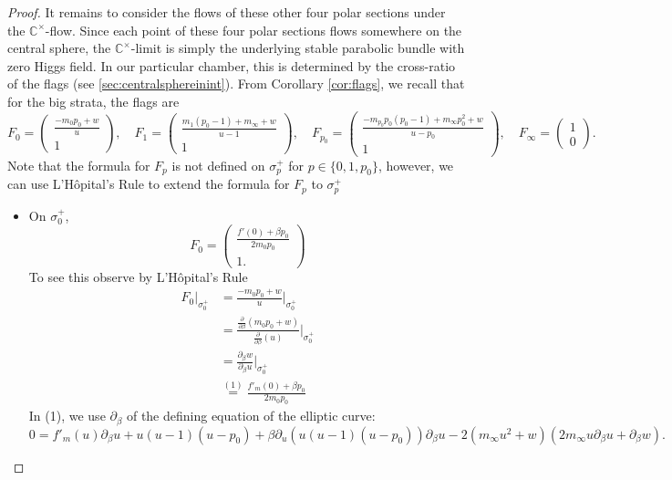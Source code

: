 \documentclass[10pt,a4paper]{amsart}
\newcommand{\C}{\ensuremath{\mathbb C}}
\def\mathbf#1{#1}%
\begin{document}
\begin{proof}
It remains to consider the flows of these other four polar sections under the $\C^\times$-flow.  Since each point of these four polar sections flows somewhere on the central sphere, the $\C^\times$-limit is simply the underlying stable parabolic bundle with zero Higgs field. In our particular chamber, this is determined by the cross-ratio of the flags (see \ref{sec:centralsphereinint}).
From Corollary \ref{cor:flags}, we recall that for the big strata, the flags are    \begin{equation*}
    F_0 = \begin{pmatrix} \frac{-m_0 p_0 +w}{u} \\ 1 \end{pmatrix}, \quad 
      F_1 = 
  \begin{pmatrix} \frac{m_1(p_0-1) + m_\infty +w}{u-1} \\ 1 \end{pmatrix}, \quad 
        F_{p_0} = \begin{pmatrix} \frac{-m_{p_0} p_0(p_0-1) + m_\infty p_0^2 +w}{u-p_0}\\ 1 \end{pmatrix}, \quad 
          F_\infty = \begin{pmatrix} 1\\ 0 \end{pmatrix}.
   \end{equation*}
   Note that the formula for $F_p$ is not defined on $\sigma^+_p$ for $p \in \{0, 1, p_0\}$, however, we can use L'H\^{o}pital's Rule to extend the formula for $F_p$ to $\sigma^+_p$
\begin{itemize}
\item On $\sigma^+_0$, \[
F_0 = \begin{pmatrix} \frac{f'(0) + \beta p_0}{2 m_0 p_0} \\ 1.\end{pmatrix}
\]
To see this observe by L'H\^{o}pital's Rule
\begin{align*} F_0\Big|_{\sigma^+_0} &= \frac{-m_0 p_0 + w}{u}\Big|_{\sigma^+_0} \\
& =\frac{\frac{\partial}{\partial \beta}(m_0 p_0 + w)}{\frac{\partial}{\partial \beta}(u)}\Big|_{\sigma^+_0}\\
&=\frac{\partial_\beta w}{\partial_\beta u} \Big|_{\sigma^+_0}\\
&\overset{(1)}{=}\frac{f'_{\mathbf{m}}(0)  + \beta p_0}{2m_0 p_0}
\end{align*}
In (1), we use $\partial_\beta$ of the defining equation of the elliptic curve:
\[ 0=f'_{\mathbf{m}}(u) \partial_\beta u + u(u-1)(u-p_0)+\beta \partial_u \left( u(u-1)(u-p_0) \right) \partial_\beta u -2 (m_\infty u^2 + w)( 2 m_\infty u \partial_\beta u + \partial_\beta w).\]

\end{itemize}
\end{proof}
\end{document}
